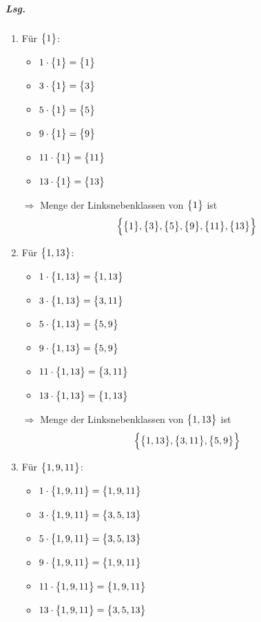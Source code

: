 \documentclass{scrreprt}
\begin{document}
\begin{enumerate}[(a)]
  \subparagraph{Lsg.}\phantom{\null}
  \begin{enumerate}[(1)]
  \item Für $\qty\big{1}$:
    \begin{itemize}
    \item $1 \cdot \qty\big{1} = \qty\big{1}$
    \item $3 \cdot \qty\big{1} = \qty\big{3}$
    \item $5 \cdot \qty\big{1} = \qty\big{5}$
    \item $9 \cdot \qty\big{1} = \qty\big{9}$
    \item $11 \cdot \qty\big{1} = \qty\big{11}$
    \item $13 \cdot \qty\big{1} = \qty\big{13}$
    \end{itemize}

    $\Rightarrow$ Menge der Linksnebenklassen von $\qty\big{1}$ ist
    \[
      \qty\Big{
        \qty\big{1},
        \qty\big{3},
        \qty\big{5},
        \qty\big{9},
        \qty\big{11},
        \qty\big{13}
      }
    \]
  \newpage
  \item Für $\qty\big{1, 13}$:
    \begin{itemize}
    \item $1 \cdot \qty\big{1, 13} = \qty\big{1, 13}$
    \item $3 \cdot \qty\big{1, 13} = \qty\big{3, 11}$
    \item $5 \cdot \qty\big{1, 13} = \qty\big{5, 9}$
    \item $9 \cdot \qty\big{1, 13} = \qty\big{5, 9}$
    \item $11 \cdot \qty\big{1, 13} = \qty\big{3, 11}$
    \item $13 \cdot \qty\big{1, 13} = \qty\big{1, 13}$
    \end{itemize}

    $\Rightarrow$ Menge der Linksnebenklassen von $\qty\big{1, 13}$ ist
    \[
      \qty\Big{
        \qty\big{1, 13},
        \qty\big{3, 11},
        \qty\big{5, 9}
      }
    \]

  \item Für $\qty\big{1, 9, 11}$:
    \begin{itemize}
    \item $1 \cdot \qty\big{1, 9, 11} = \qty\big{1, 9, 11}$
    \item $3 \cdot \qty\big{1, 9, 11} = \qty\big{3, 5, 13}$
    \item $5 \cdot \qty\big{1, 9, 11} = \qty\big{3, 5, 13}$
    \item $9 \cdot \qty\big{1, 9, 11} = \qty\big{1, 9, 11}$
    \item $11 \cdot \qty\big{1, 9, 11} = \qty\big{1, 9, 11}$
    \item $13 \cdot \qty\big{1, 9, 11} = \qty\big{3, 5, 13}$
    \end{itemize}


\end{enumerate}
\end{enumerate}
\end{document}

